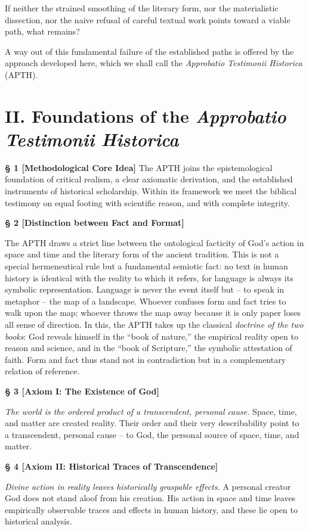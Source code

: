 \documentclass[11pt,a4paper]{article}
\makeatletter
\newcommand{\apth}{{\apthfont APTH}\hspace{0.15em}\xspace}
\newcommand{\apthsec}[3]{%
  \phantomsection%
  \def\@currentlabel{#1}%
  \label{sec:#3}%
  \textbf{§ #1 [#2]}%
}
\makeatother
\begin{document}
If neither the strained smoothing of the literary form, nor the materialistic dissection, nor the naive refusal of careful textual work points toward a viable path, what remains?

A way out of this fundamental failure of the established paths is offered by the approach developed here, which we shall call the \textit{Approbatio Testimonii Historica} (\apth).

\section*{II. Foundations of the \textit{Approbatio Testimonii Historica}}

\apthsec{1}{Methodological Core Idea}{kerngedanke} The \apth joins the epistemological foundation of critical realism, a clear axiomatic derivation, and the established instruments of historical scholarship. Within its framework we meet the biblical testimony on equal footing with scientific reason, and with complete integrity.

\apthsec{2}{Distinction between Fact and Format}{faktum-format} 
The \apth draws a strict line between the ontological facticity of God's action in space and time and the literary form of the ancient tradition. This is not a special hermeneutical rule but a fundamental semiotic fact: no text in human history is identical with the reality to which it refers, for language is always its symbolic representation. Language is never the event itself but -- to speak in metaphor -- the map of a landscape. Whoever confuses form and fact tries to walk upon the map; whoever throws the map away because it is only paper loses all sense of direction. In this, the \apth takes up the classical \textit{doctrine of the two books}: God reveals himself in the ``book of nature,'' the empirical reality open to reason and science, and in the ``book of Scripture,'' the symbolic attestation of faith. Form and fact thus stand not in contradiction but in a complementary relation of reference.

\apthsec{3}{Axiom I: The Existence of God}{axiom-i} 
\textit{The world is the ordered product of a transcendent, personal cause.}
Space, time, and matter are created reality. Their order and their very describability point to a transcendent, personal cause -- to God, the personal source of space, time, and matter.

\apthsec{4}{Axiom II: Historical Traces of Transcendence}{axiom-ii} 
\textit{Divine action in reality leaves historically graspable effects.}
A personal creator God does not stand aloof from his creation. His action in space and time leaves empirically observable traces and effects in human history, and these lie open to historical analysis.
\end{document}
